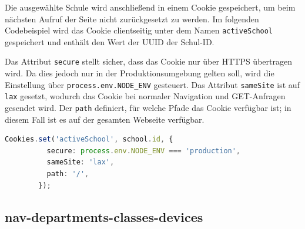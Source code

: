 \begin{inhalt}
\clearpage

Die ausgewählte Schule wird anschließend in einem Cookie gespeichert, um beim nächsten Aufruf der Seite nicht zurückgesetzt zu werden.  
Im folgenden Codebeispiel wird das Cookie clientseitig unter dem Namen \texttt{activeSchool} gespeichert und enthält den Wert der UUID der Schul-ID.

Das Attribut \texttt{secure} stellt sicher, dass das Cookie nur über HTTPS übertragen wird.  
Da dies jedoch nur in der Produktionsumgebung gelten soll, wird die Einstellung über \texttt{process.env.NODE\_ENV} gesteuert.  
Das Attribut \texttt{sameSite} ist auf \texttt{lax} gesetzt, wodurch das Cookie bei normaler Navigation und GET-Anfragen gesendet wird.  
Der \texttt{path} definiert, für welche Pfade das Cookie verfügbar ist; in diesem Fall ist es auf der gesamten Webseite verfügbar.


\begin{lstlisting}[language=TypeScript]
    Cookies.set('activeSchool', school.id, {
          secure: process.env.NODE_ENV === 'production',
          sameSite: 'lax',
          path: '/',
        });
\end{lstlisting}










\subsection{nav-departments-classes-devices}



\end{inhalt}
